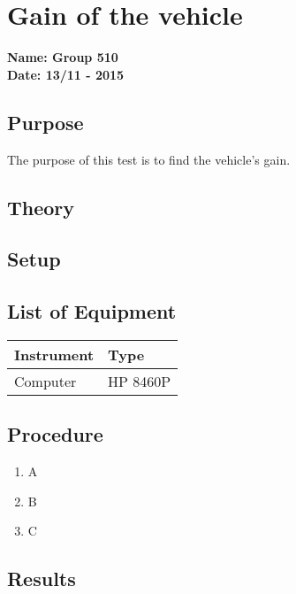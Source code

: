 \pagebreak
\section{Gain of the vehicle} %
\textbf{Name: Group 510}\\
\textbf{Date: 13/11 - 2015}

\subsection{Purpose}
The purpose of this test is to find the vehicle's gain.

\subsection{Theory}

\subsection{Setup}

\subsection{List of Equipment}

\begin{table}[H]
\begin{tabular}{|p{10cm}|p{4cm}|}
\hline%
  \textbf{Instrument}                     &  \textbf{Type}       \\
\hline%
  Computer                                &  HP 8460P    \\
\hline %
\end{tabular}
\end{table}

\subsection{Procedure}

\begin{enumerate}
  \item A
  \item B
  \item C
\end{enumerate}

\subsection{Results}


